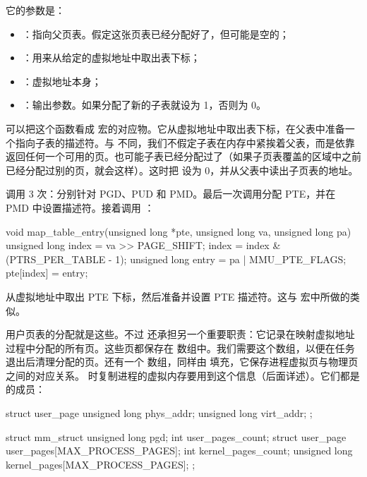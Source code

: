 它的参数是：

\begin{itemize}
  \item {}：指向父页表。假定这张页表已经分配好了，但可能是空的；
  \item {}：用来从给定的虚拟地址中取出表下标；
  \item {}：虚拟地址本身；
  \item {}：输出参数。如果分配了新的子表就设为 1，否则为 0。
\end{itemize}

可以把这个函数看成  宏的对应物。它从虚拟地址中取出表下标，在父表中准备一个指向子表的描述符。与  不同，我们不假定子表在内存中紧挨着父表，而是依靠  返回任何一个可用的页。也可能子表已经分配过了（如果子页表覆盖的区域中之前已经分配过别的页，就会这样）。这时把  设为 0，并从父表中读出子页表的地址。

 调用  3 次：分别针对 PGD、PUD 和 PMD。最后一次调用分配 PTE，并在 PMD 中设置描述符。接着调用 ：

\begin{ccode}
void map_table_entry(unsigned long *pte, unsigned long va, unsigned long pa) {
	unsigned long index = va >> PAGE_SHIFT;
	index = index & (PTRS_PER_TABLE - 1);
	unsigned long entry = pa | MMU_PTE_FLAGS;
	pte[index] = entry;
}
\end{ccode}

 从虚拟地址中取出 PTE 下标，然后准备并设置 PTE 描述符。这与  宏中所做的类似。

用户页表的分配就是这些。不过  还承担另一个重要职责：它记录在映射虚拟地址过程中分配的所有页。这些页都保存在  数组中。我们需要这个数组，以便在任务退出后清理分配的页。还有一个  数组，同样由  填充，它保存进程虚拟页与物理页之间的对应关系。 时复制进程的虚拟内存要用到这个信息（后面详述）。它们都是  的成员：

\begin{ccode}
struct user_page {
	unsigned long phys_addr;
	unsigned long virt_addr;
};

struct mm_struct {
	unsigned long pgd;
	int user_pages_count;
	struct user_page user_pages[MAX_PROCESS_PAGES];
	int kernel_pages_count;
	unsigned long kernel_pages[MAX_PROCESS_PAGES];
};
\end{ccode}

